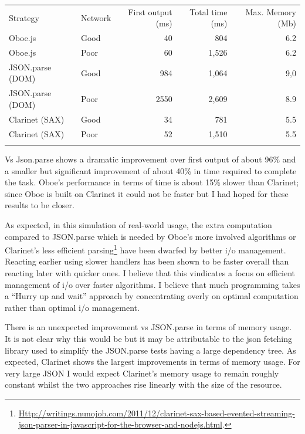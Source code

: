 \documentclass[]{article}
\begin{document}
\begin{longtable}[c]{@{}llrrr@{}}
\hline\noalign{\medskip}
Strategy & Network & First output (ms) & Total time (ms) & Max. Memory
(Mb)
\\\noalign{\medskip}
\hline\noalign{\medskip}
Oboe.js & Good & 40 & 804 & 6.2
\\\noalign{\medskip}
Oboe.js & Poor & 60 & 1,526 & 6.2
\\\noalign{\medskip}
JSON.parse (DOM) & Good & 984 & 1,064 & 9,0
\\\noalign{\medskip}
JSON.parse (DOM) & Poor & 2550 & 2,609 & 8.9
\\\noalign{\medskip}
Clarinet (SAX) & Good & 34 & 781 & 5.5
\\\noalign{\medskip}
Clarinet (SAX) & Poor & 52 & 1,510 & 5.5
\\\noalign{\medskip}
\hline
\end{longtable}

Vs Json.parse shows a dramatic improvement over first output of about
96\% and a smaller but significant improvement of about 40\% in time
required to complete the task. Oboe's performance in terms of time is
about 15\% slower than Clarinet; since Oboe is built on Clarinet it
could not be faster but I had hoped for these results to be closer.

As expected, in this simulation of real-world usage, the extra
computation\\compared to JSON.parse which is needed by Oboe's more
involved algorithms or Clarinet's less efficient parsing\footnote{\href{http://writings.nunojob.com/2011/12/clarinet-sax-based-evented-streaming-json-parser-in-javascript-for-the-browser-and-nodejs.html}{Http://writings.nunojob.com/2011/12/clarinet-sax-based-evented-streaming-json-parser-in-javascript-for-the-browser-and-nodejs.html}.}
have been dwarfed by better i/o management. Reacting earlier using
slower handlers has been shown to be faster overall than reacting later
with quicker ones. I believe that this vindicates a focus on efficient
management of i/o over faster algorithms. I believe that much
programming takes a ``Hurry up and wait'' approach by concentrating
overly on optimal computation rather than optimal i/o management.

There is an unexpected improvement vs JSON.parse in terms of memory
usage. It is not clear why this would be but it may be attributable to
the json fetching library used to simplify the JSON.parse tests having a
large dependency tree. As expected, Clarinet shows the largest
improvements in terms of memory usage. For very large JSON I would
expect Clarinet's memory usage to remain roughly constant whilst the two
approaches rise linearly with the size of the resource.
\end{document}
